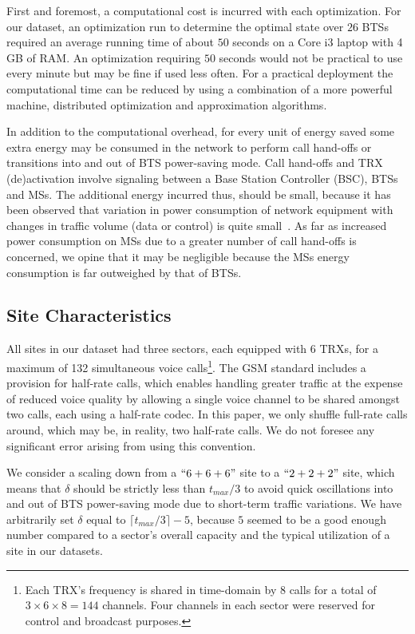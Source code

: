 First and foremost, a computational cost is incurred with each optimization. For our dataset, an optimization run to determine the optimal state over $26$ BTSs required an average running time of about $50$ seconds on a Core i3 laptop with 4 GB of RAM. An optimization requiring $50$ seconds would not be practical to use every minute but may be fine if used less often. For a practical deployment the computational time can be reduced by using a combination of a more powerful machine, distributed optimization and approximation algorithms. 

In addition to the computational overhead, for every unit of energy saved some extra energy may be consumed in the network to perform call hand-offs or transitions into and out of BTS power-saving mode. Call hand-offs and TRX (de)activation involve signaling between a Base Station Controller (BSC), BTSs and MSs. The additional energy incurred thus, should be small, because it has been observed that variation in power consumption of network equipment with changes in traffic volume (data or control) is quite small~\cite{Chabarek08powerawareness}. As far as increased power consumption on MSs due to a greater number of call hand-offs is concerned, we opine that it may be negligible because the MSs energy consumption is far outweighed by that of BTSs.

\subsection{Site Characteristics}
\label{subsec:case2:experiments:sitetypes} All sites in our dataset had three sectors, each equipped with 6 TRXs, for a maximum of 132 simultaneous voice calls\footnote[1]{Each TRX's frequency is shared in time-domain  by 8 calls for  a total of $3\times6\times8=144$ channels. Four channels in each sector were reserved for control and broadcast purposes.}. The GSM standard includes a provision for half-rate calls, which enables handling greater traffic at the expense of reduced voice quality by allowing a single voice channel to be shared amongst two calls, each using a half-rate codec. In this paper, we only shuffle full-rate calls around, which may be, in reality, two half-rate calls. We do not foresee any significant error arising from using this convention.

We consider a scaling down from a $``6+6+6"$ site to a $``2+2+2"$ site, which means that $\delta$ should be strictly less than $t_{max}/3$ to avoid quick oscillations into and out of BTS power-saving mode due to short-term traffic variations. We have arbitrarily set $\delta$ equal to $\lceil t_{max}/3\rceil -5$, because $5$ seemed to be a good enough number compared to a sector's overall capacity and the typical utilization of a site in our datasets.

